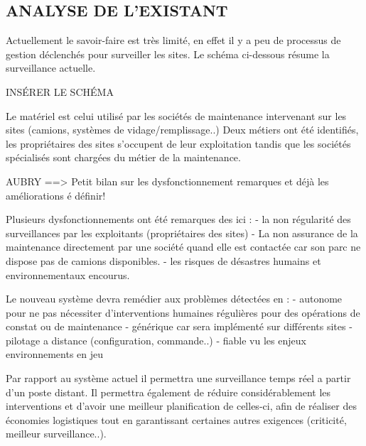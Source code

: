 \documentclass{article}
\begin{document}
\subsection{ANALYSE DE L'EXISTANT}

		Actuellement le savoir-faire est très limité, en effet il y a peu de processus de gestion déclenchés pour surveiller les sites. Le schéma ci-dessous résume la surveillance actuelle.
\newline

					INSÉRER LE SCHÉMA

\newline

		Le matériel est celui utilisé par les sociétés de maintenance intervenant sur les sites (camions, systèmes de vidage/remplissage..)
Deux métiers ont été identifiés, les propriétaires des sites s'occupent de leur exploitation tandis que les sociétés spécialisés sont chargées du métier de la maintenance.

AUBRY ==> Petit bilan sur les dysfonctionnement remarques et déjà les améliorations é définir!

	Plusieurs dysfonctionnements ont été remarques des ici : 
	- la non régularité des surveillances par les exploitants (propriétaires des sites)
	- La non assurance de la maintenance directement par une société quand elle est contactée car son parc ne dispose pas de camions disponibles.
	- les risques de désastres humains et environnementaux encourus.
	
	Le nouveau système devra remédier aux problèmes détectées en : 
	- autonome pour ne pas nécessiter d'interventions humaines régulières pour des opérations de constat ou de maintenance
	- générique car sera implémenté sur différents sites
	- pilotage a distance (configuration, commande..)
	- fiable vu les enjeux environnements en jeu
	
	Par rapport au système actuel il permettra une surveillance temps réel a partir d'un poste distant. 
	Il permettra également de réduire considérablement les interventions et d'avoir une meilleur planification de celles-ci, afin de réaliser des économies logistiques tout en garantissant certaines autres exigences (criticité, meilleur surveillance..).
	
\end{document}
